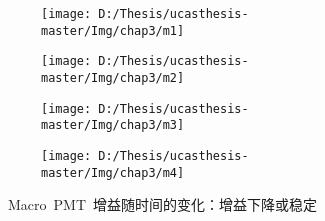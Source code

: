 \begin{figure}[!htb]
  \centering
  \begin{subfigure}[b]{\MySubFactor\textwidth}
    \texttt{[image: D:/Thesis/ucasthesis-master/Img/chap3/m1]}
    \caption{}
    \label{fig:gainpmt2_1}
  \end{subfigure}%
  \begin{subfigure}[b]{\MySubFactor\textwidth}
    \texttt{[image: D:/Thesis/ucasthesis-master/Img/chap3/m2]}
    \caption{}
    \label{fig:gainpmt2_2}
  \end{subfigure}
   \begin{subfigure}[b]{\MySubFactor\textwidth}
    \texttt{[image: D:/Thesis/ucasthesis-master/Img/chap3/m3]}
    \caption{}
    \label{fig:gainpmt2_3}
  \end{subfigure}%
  \begin{subfigure}[b]{\MySubFactor\textwidth}
    \texttt{[image: D:/Thesis/ucasthesis-master/Img/chap3/m4]}
    \caption{}
    \label{fig:gainpmt2_4}
  \end{subfigure}
  \caption{~Macro~PMT~增益随时间的变化：增益下降或稳定}
  \label{fig:gainpmt2}
\end{figure}
